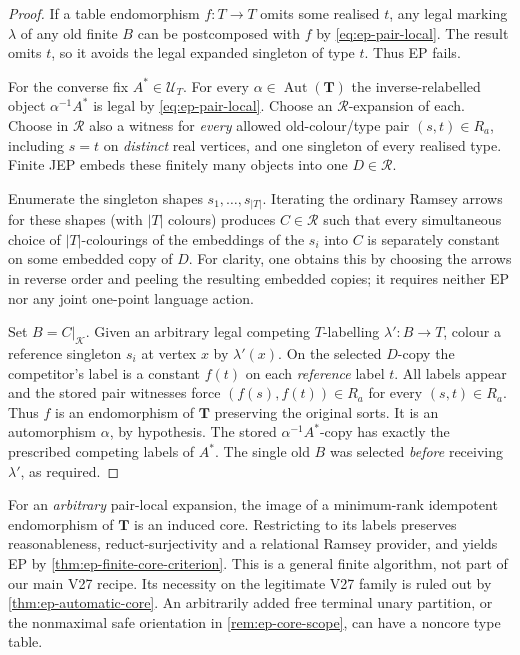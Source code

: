 \begin{proof}
If a table endomorphism \(f:T\to T\) omits
some realised \(t\), any legal marking
\(\lambda\) of any old finite \(B\) can be
postcomposed with \(f\) by
\eqref{eq:ep-pair-local}. The result omits
\(t\), so it avoids the legal expanded singleton
of type \(t\). Thus EP fails.

For the converse fix \(A^*\in\mathcal U_T\).
For every \(\alpha\in\operatorname{Aut}(\mathbf T)\)
the inverse-relabelled object
\(\alpha^{-1}A^*\) is legal by
\eqref{eq:ep-pair-local}. Choose an
\(\mathcal R\)-expansion of each. Choose in
\(\mathcal R\) also a witness for \emph{every}
allowed old-colour/type pair
\((s,t)\in R_a\), including \(s=t\) on
\emph{distinct} real vertices, and one
singleton of every realised type. Finite
JEP embeds these finitely many objects into
one \(D\in\mathcal R\).

Enumerate the singleton shapes
\(s_1,\ldots,s_{|T|}\). Iterating the ordinary
Ramsey arrows for these shapes (with \(|T|\)
colours) produces \(C\in\mathcal R\)
such that every simultaneous choice of
\(|T|\)-colourings of the embeddings of the
\(s_i\) into \(C\) is separately constant on
some embedded copy of \(D\). For clarity,
one obtains this by choosing the arrows in
reverse order and peeling the resulting
embedded copies; it requires neither EP
nor any joint one-point language action.

Set \(B=C|_{\mathcal K}\). Given an arbitrary
legal competing \(T\)-labelling
\(\lambda':B\to T\), colour a reference
singleton \(s_i\) at vertex \(x\) by
\(\lambda'(x)\). On the selected \(D\)-copy
the competitor's label is a constant
\(f(t)\) on each \emph{reference} label \(t\).
All labels appear and the stored pair
witnesses force
\((f(s),f(t))\in R_a\) for every
\((s,t)\in R_a\). Thus \(f\) is an
endomorphism of \(\mathbf T\) preserving
the original sorts. It is an
automorphism \(\alpha\), by hypothesis.
The stored \(\alpha^{-1}A^*\)-copy
has exactly the prescribed competing
labels of \(A^*\). The single old \(B\)
was selected \emph{before} receiving
\(\lambda'\), as required.
\end{proof}

\begin{remark}
\label{rem:ep-core-filter}
For an \emph{arbitrary} pair-local expansion,
the image of a minimum-rank idempotent
endomorphism of \(\mathbf T\) is an induced
core. Restricting to its labels preserves
reasonableness, reduct-surjectivity and a
relational Ramsey provider, and yields EP
by \cref{thm:ep-finite-core-criterion}.
This is a general finite algorithm, not
part of our main V27 recipe. Its necessity
on the legitimate V27 family is ruled out
by \cref{thm:ep-automatic-core}. An
arbitrarily added free terminal unary
partition, or the nonmaximal safe
orientation in \cref{rem:ep-core-scope},
can have a noncore type table.
\end{remark}

